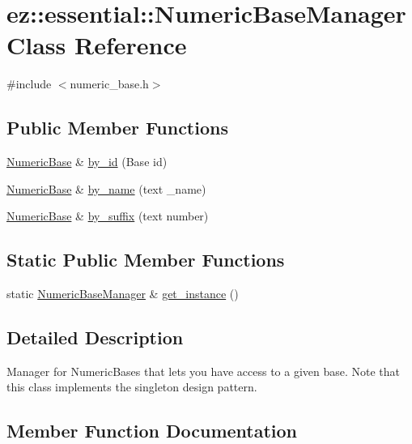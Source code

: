 \hypertarget{classez_1_1essential_1_1NumericBaseManager}{}\section{ez\+:\+:essential\+:\+:Numeric\+Base\+Manager Class Reference}
\label{classez_1_1essential_1_1NumericBaseManager}


{\ttfamily \#include $<$numeric\+\_\+base.\+h$>$}

\subsection*{Public Member Functions}
\begin{DoxyCompactItemize}
\item 
\hyperlink{classez_1_1essential_1_1NumericBase}{Numeric\+Base} \& \hyperlink{classez_1_1essential_1_1NumericBaseManager_af219a70d368485268f5c8dd66f2a6df1}{by\+\_\+id} (Base id)
\item 
\hyperlink{classez_1_1essential_1_1NumericBase}{Numeric\+Base} \& \hyperlink{classez_1_1essential_1_1NumericBaseManager_a08b4f97124709d5641d595a8863f300e}{by\+\_\+name} (text \+\_\+name)
\item 
\hyperlink{classez_1_1essential_1_1NumericBase}{Numeric\+Base} \& \hyperlink{classez_1_1essential_1_1NumericBaseManager_a52a521ef2f57e881184724a38ba97cc2}{by\+\_\+suffix} (text number)
\end{DoxyCompactItemize}
\subsection*{Static Public Member Functions}
\begin{DoxyCompactItemize}
\item 
static \hyperlink{classez_1_1essential_1_1NumericBaseManager}{Numeric\+Base\+Manager} \& \hyperlink{classez_1_1essential_1_1NumericBaseManager_ae0211a05efad4e04051e8ebf30ea2b7c}{get\+\_\+instance} ()
\end{DoxyCompactItemize}


\subsection{Detailed Description}
Manager for Numeric\+Bases that lets you have access to a given base. Note that this class implements the singleton design pattern. 

\subsection{Member Function Documentation}
\mbox{\label{classez_1_1essential_1_1NumericBaseManager_af219a70d368485268f5c8dd66f2a6df1}} 
